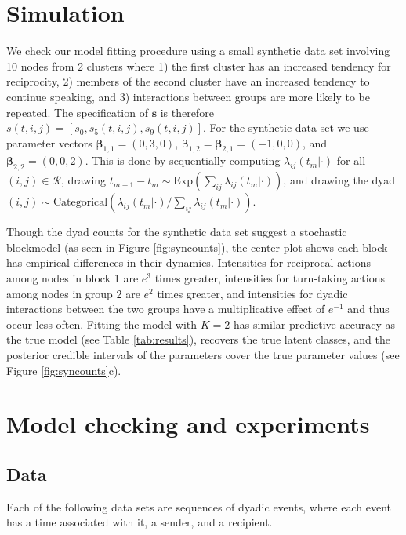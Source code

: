\documentclass{article}
\begin{document}
\section{Simulation}

We check our model fitting procedure using a small synthetic data set involving 10 nodes from 2 clusters where 1) the first cluster has an increased tendency for reciprocity, 2) members of the second cluster have an increased tendency to continue speaking, and 3) interactions between groups are more likely to be repeated.  The specification of $\textbf{s}$ is therefore $s(t,i,j) = [s_0, s_{5}(t,i,j), s_{9}(t,i,j)]$.  For the synthetic data set we use parameter vectors $\boldsymbol{\beta}_{1,1} = (0,3,0)$,  $\boldsymbol{\beta}_{1,2} = \boldsymbol{\beta}_{2,1} = (-1,0,0)$, and $\boldsymbol{\beta}_{2,2} = (0,0,2)$.  This is done by sequentially computing $\lambda_{ij}(t_m|\cdot)$ for all $(i,j) \in \mathcal{R}$, drawing $t_{m+1}-t_m \sim \mbox{Exp}(\sum_{ij} \lambda_{ij}(t_m|\cdot))$, and drawing the dyad $(i,j) \sim \mbox{Categorical}(\lambda_{ij}(t_m|\cdot) / \sum_{ij}\lambda_{ij}(t_m|\cdot))$.  

Though the dyad counts for the synthetic data set suggest a stochastic blockmodel (as seen in Figure  \ref{fig:syncounts}),  the center plot shows each block has empirical differences in their dynamics.  Intensities for reciprocal actions among nodes in block 1 are $e^3$ times greater, intensities for turn-taking actions among nodes in group 2 are $e^2$ times greater, and intensities for dyadic interactions between the two groups have a multiplicative effect of $e^{-1}$ and thus occur less often.  Fitting the model with $K=2$ has similar  predictive accuracy as the true model (see Table \ref{tab:results}), recovers the true latent classes, and the posterior credible intervals of the parameters cover the true parameter values (see Figure \ref{fig:syncounts}c).

\section{Model checking and experiments}

\subsection{Data}

Each of the following data sets are sequences of dyadic events, where each event has a time associated with it, a sender, and a recipient.
\end{document}
